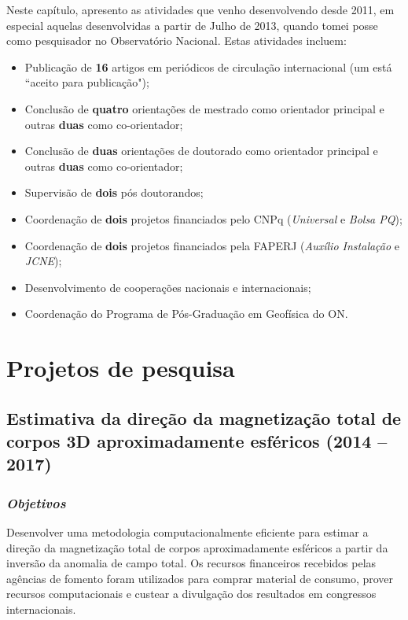 Neste capítulo, apresento as atividades que venho desenvolvendo desde 2011, 
em especial aquelas desenvolvidas a partir de Julho de 2013, quando tomei 
posse como pesquisador no Observatório Nacional. Estas atividades incluem:
\begin{itemize}
	\item Publicação de \textbf{16} artigos em periódicos de circulação
	internacional (um está ``aceito para publicação");
	\item Conclusão de \textbf{quatro} orientações de mestrado como orientador
	principal e outras \textbf{duas} como co-orientador;
	\item Conclusão de \textbf{duas} orientações de doutorado como orientador 
	principal e outras \textbf{duas} como co-orientador;
	\item Supervisão de \textbf{dois} pós doutorandos;
	\item Coordenação de \textbf{dois} projetos financiados pelo CNPq
	(\textit{Universal} e \textit{Bolsa PQ});
	\item Coordenação de \textbf{dois} projetos financiados pela FAPERJ
	(\textit{Auxílio Instalação} e \textit{JCNE});
	\item Desenvolvimento de cooperações nacionais e internacionais;
	\item Coordenação do Programa de Pós-Graduação em Geofísica do ON.
\end{itemize}



\section{Projetos de pesquisa}


\subsection{Estimativa da direção da magnetização total de corpos 3D aproximadamente esféricos (2014 -- 2017)} \label{projeto-Daiana}

\subsubsection{\emph{Objetivos}}

Desenvolver uma metodologia computacionalmente eficiente para estimar a direção da 
magnetização total de corpos aproximadamente esféricos a partir da inversão da 
anomalia de campo total. Os recursos financeiros recebidos pelas agências de fomento 
foram utilizados para comprar material de consumo, prover recursos computacionais e 
custear a divulgação dos resultados em congressos internacionais.

